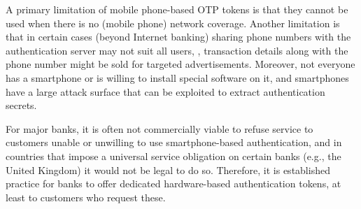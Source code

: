 A primary limitation of mobile phone-based OTP tokens is that they cannot be used when there is no (mobile phone) network coverage. Another limitation is that in certain cases (beyond Internet banking) sharing phone numbers with the authentication server may not suit all users, \eg, transaction details along with the phone number might be sold for targeted advertisements. Moreover, not everyone has a smartphone or is willing to install special software on it, and smartphones have a large attack surface that can be exploited to extract authentication secrets.

For major banks, it is often not commercially viable to refuse service to customers unable or unwilling to use smartphone-based authentication, and in countries that impose a universal service obligation on certain banks (e.g., the United Kingdom) it would not be legal to do so.
Therefore, it is established practice for banks to offer dedicated hardware-based authentication tokens, at least to customers who request these.

%




%







